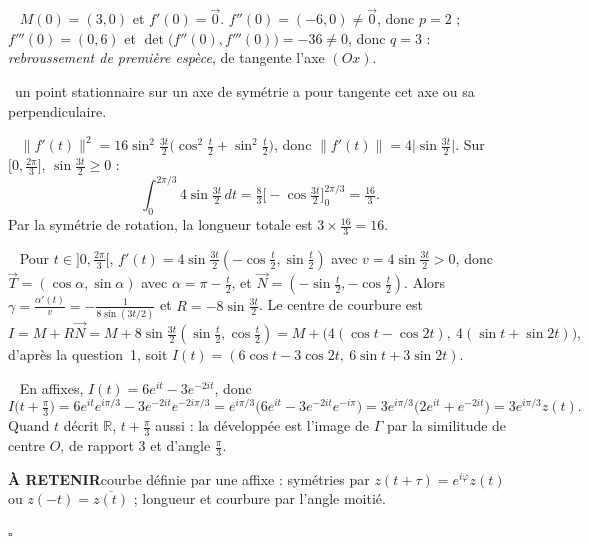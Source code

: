 \documentclass[a4paper,11pt]{article}
\numberwithin{equation}{section}
\numberwithin{figure}{section}
\numberwithin{table}{section}
\theoremstyle{enonce}
\theoremstyle{exemple}
\theoremstyle{remarque}
\newcommand{\R}{\mathbb{R}}
\newcommand{\ve}[1]{\vec{#1}}
\newcommand{\gain}[1]{\par\noindent{\sffamily\bfseries\small\color{Ocre}Astuce.}\ #1\par}
\newcommand{\retenir}[1]{\begin{retenirbox}{\sffamily\bfseries\footnotesize\color{Ocre}À RETENIR}\quad #1\end{retenirbox}}
\newcommand{\q}[1]{\par\smallskip\noindent{\sffamily\bfseries\color{Bleu}#1}\ }
\begin{document}
\q{2.(e)} $M(0)=(3,0)$ et $f'(0)=\ve0$. $f''(0)=(-6,0)\neq\ve0$, donc $p=2$ ; $f'''(0)=(0,6)$ et $\det\big(f''(0),f'''(0)\big)=-36\neq0$, donc $q=3$ : \emph{rebroussement de première espèce}, de tangente l'axe $(Ox)$.
\gain{un point stationnaire sur un axe de symétrie a pour tangente cet axe ou sa perpendiculaire.}

\q{2.(f)} $\|f'(t)\|^2=16\sin^2\frac{3t}2\big(\cos^2\frac t2+\sin^2\frac t2\big)$, donc $\|f'(t)\|=4\big|\sin\frac{3t}2\big|$. Sur $\big[0,\frac{2\pi}3\big]$, $\sin\frac{3t}2\geq0$ :
\[\int_0^{2\pi/3}4\sin\tfrac{3t}2\,dt=\tfrac83\Big[-\cos\tfrac{3t}2\Big]_0^{2\pi/3}=\tfrac{16}3.\]
Par la symétrie de rotation, la longueur totale est $3\times\frac{16}3=16$.

\q{3.(a)} Pour $t\in\big]0,\frac{2\pi}3\big[$, $f'(t)=4\sin\frac{3t}2\left(-\cos\frac t2,\sin\frac t2\right)$ avec $v=4\sin\frac{3t}2>0$, donc $\ve T=(\cos\alpha,\sin\alpha)$ avec $\alpha=\pi-\frac t2$, et $\ve N=\left(-\sin\frac t2,-\cos\frac t2\right)$. Alors $\gamma=\frac{\alpha'(t)}{v}=-\frac1{8\sin(3t/2)}$ et $R=-8\sin\frac{3t}2$. Le centre de courbure est
\[I=M+R\ve N=M+8\sin\tfrac{3t}2\left(\sin\tfrac t2,\cos\tfrac t2\right)=M+\big(4(\cos t-\cos2t),\ 4(\sin t+\sin2t)\big),\]
d'après la question~1, soit $I(t)=(6\cos t-3\cos2t,\ 6\sin t+3\sin2t)$.

\q{3.(b)} En affixes, $I(t)=6e^{it}-3e^{-2it}$, donc
\[I\big(t+\tfrac\pi3\big)=6e^{it}e^{i\pi/3}-3e^{-2it}e^{-2i\pi/3}=e^{i\pi/3}\big(6e^{it}-3e^{-2it}e^{-i\pi}\big)=3e^{i\pi/3}\big(2e^{it}+e^{-2it}\big)=3e^{i\pi/3}z(t).\]
Quand $t$ décrit $\R$, $t+\frac\pi3$ aussi : la développée est l'image de $\Gamma$ par la similitude de centre $O$, de rapport $3$ et d'angle $\frac\pi3$.
\retenir{courbe définie par une affixe : symétries par $z(t+\tau)=e^{i\varphi}z(t)$ ou $z(-t)=\overline{z(t)}$ ; longueur et courbure par l'angle moitié.}
\par\hfill\textcolor{BleuClair}{$\square$}\par
\end{document}

